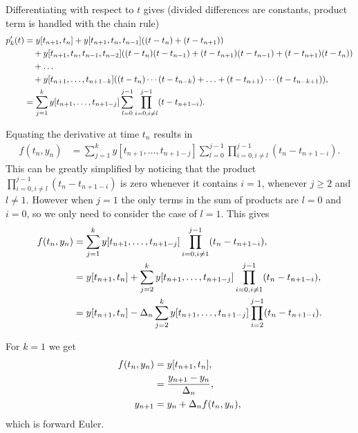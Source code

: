 Differentiating with respect to $t$ gives (divided differences are constants, product term is handled with the chain rule)
\begin{equation}
  \begin{aligned}
    p_k'(t) &= y[t_{n+1}, t_n] + y[t_{n+1}, t_n, t_{n-1}]{\left( (t - t_n) + (t - t_{n+1}) \right)} \\
    &\quad + y[t_{n+1}, t_n, t_{n-1}, t_{n-2}]{\left( (t - t_n)(t - t_{n-1}) + (t - t_{n+1})(t - t_{n-1}) + (t - t_{n+1})(t - t_n) \right)} \\
    &\quad + \ldots \\
    &\quad + y[t_{n+1}, \ldots, t_{n+1-k}]{\left( (t-t_{n})\cdots(t-t_{n-k}) + \ldots + (t-t_{n+1})\cdots(t-t_{n-k+1}) \right)}, \\
    &= \sum_{j=1}^k y[t_{n+1}, \ldots, t_{n+1-j}] \sum_{l=0}^{j-1} \prod_{i=0, i \neq l}^{j-1} (t - t_{n+1-i}).
  \end{aligned}
\end{equation} 

Equating the derivative at time $t_n$ results in
\begin{equation}
  \begin{aligned}
    f(t_n, y_n) &= \sum_{j=1}^k y[t_{n+1}, \ldots, t_{n+1-j}] \sum_{l=0}^{j-1} \prod_{i=0, i \neq l}^{j-1} (t_n - t_{n+1-i}).
  \end{aligned}
\end{equation} 
This can be greatly simplified by noticing that the product $ \prod_{i=0, i \neq l}^{j-1} (t_n - t_{n+1-i})$ is zero whenever it contains $i=1$, \ie whenever $j \geq 2$ and $l \neq 1$.
However when $j=1$ the only terms in the sum of products are $l=0$ and $i=0$, so we only need to consider the case of $l=1$.
This gives
\begin{equation}
  \begin{aligned}
    f(t_n, y_n) &= \sum_{j=1}^k y[t_{n+1}, \ldots, t_{n+1-j}] \prod_{i=0, i \neq 1}^{j-1} (t_n - t_{n+1-i}), \\
    &= y[t_{n+1}, t_n] + \sum_{j=2}^k y[t_{n+1}, \ldots, t_{n+1-j}] \prod_{i=0, i \neq 1}^{j-1} (t_n - t_{n+1-i}), \\
    &= y[t_{n+1}, t_n] -\Delta_{n} \sum_{j=2}^k y[t_{n+1}, \ldots, t_{n+1-j}] \prod_{i=2}^{j-1} (t_n - t_{n+1-i}). \\
  \end{aligned}
\end{equation}

For $k=1$ we get
\begin{equation}
  \begin{aligned}
    f(t_n, y_n) &= y[t_{n+1}, t_n], \\
    &= \frac{y_{n+1} - y_n}{\Delta_{n}}, \\
    y_{n+1} &= y_n + \Delta_{n} f(t_n, y_n), \\
  \end{aligned}
\end{equation} 
which is forward Euler.

